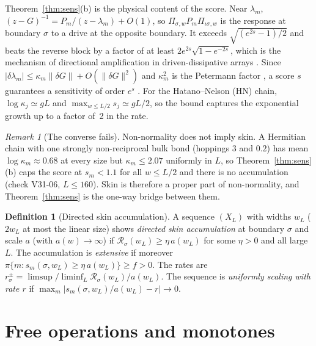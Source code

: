 \documentclass[11pt]{article}
\theoremstyle{definition}
\newtheorem{definition}{Definition}
\theoremstyle{remark}
\newtheorem{remark}{Remark}
\newcommand{\isig}{\iota\sigma}
\begin{document}
Theorem~\ref{thm:sens}(b) is the physical content of the score. Near $\lambda_m$, $(z-G)^{-1}=P_m/(z-\lambda_m)+O(1)$, so $\Pi_{\sigma,w}P_m\Pi_{\isig,w}$ is the response at boundary $\sigma$ to a drive at the opposite boundary. It exceeds $\sqrt{(e^{2s}-1)/2}$ and beats the reverse block by a factor of at least $2e^{2s}\sqrt{1-e^{-2s}}$, which is the mechanism of directional amplification in driven-dissipative arrays \cite{Por19,WBN20}. Since $|\delta\lambda_m|\le\kappa_m\|\delta G\|+O(\|\delta G\|^2)$ and $\kappa_m^2$ is the Petermann factor \cite{Pet79}, a score $s$ guarantees a sensitivity of order $e^{s}$ \cite{BB20}. For the Hatano--Nelson (HN) chain, $\log\kappa_j\simeq gL$ and $\max_{w\le L/2}s_j\simeq gL/2$, so the bound captures the exponential growth up to a factor of~2 in the rate.

\begin{remark}[The converse fails]\label{rem:converse}
Non-normality does not imply skin. A Hermitian chain with one strongly non-reciprocal bulk bond (hoppings $3$ and $0.2$) has mean $\log\kappa_m\approx0.68$ at every size but $\kappa_m\le2.07$ uniformly in $L$, so Theorem~\ref{thm:sens}(b) caps the score at $s_m<1.1$ for all $w\le L/2$ and there is no accumulation (check V31-06, $L\le160$). Skin is therefore a proper part of non-normality, and Theorem~\ref{thm:sens} is the one-way bridge between them.
\end{remark}

\begin{definition}[Directed skin accumulation]\label{def:phys}
A sequence $(X_L)$ with widths $w_L$ ($2w_L$ at most the linear size) shows \emph{directed skin accumulation} at boundary $\sigma$ and scale $a$ (with $a(w)\to\infty$) if $\mathcal R_\sigma(w_L)\ge\eta\,a(w_L)$ for some $\eta>0$ and all large $L$. The accumulation is \emph{extensive} if moreover $\pi\{m:s_m(\sigma,w_L)\ge\eta\, a(w_L)\}\ge f>0$. The rates are $r^\pm_\sigma=\limsup/\liminf_L\mathcal R_\sigma(w_L)/a(w_L)$. The sequence is \emph{uniformly scaling with rate $r$} if $\max_m|s_m(\sigma,w_L)/a(w_L)-r|\to0$.
\end{definition}

\section{Free operations and monotones}
\label{sec:rt}
\end{document}
